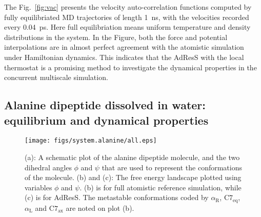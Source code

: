\documentclass[epjST]{svjour}
\newcommand{\recheck}[1]{{\color{red} #1}}
\newcommand{\confa}[0]{{\alpha_{\textrm{R}}}}
\newcommand{\confb}[0]{{\textrm{C}7_{\textrm{eq}}}}
\newcommand{\confc}[0]{{\alpha_{\textrm{L}}}}
\newcommand{\confd}[0]{{\textrm{C}7_{\textrm{ax}}}}
\begin{document}
The Fig.~\ref{fig:vac} presents the velocity auto-correlation
functions computed by fully equilibriated MD trajectories of length 1~ns, with the
velocities recorded every 0.04~ps.  Here full equilibriation means
uniform temperature and density distributions in the system.
In the Figure, both the force and potential interpolations are
in almost perfect agreement with the  atomistic simulation under Hamiltonian dynamics.
This indicates that the AdResS with the local thermostat
is a promising method to investigate the dynamical properties
in the concurrent multiscale simulation.




\subsection{Alanine dipeptide dissolved in water: equilibrium and dynamical properties}

\begin{figure}
  \centering
  \texttt{[image: figs/system.alanine/all.eps]}
  \caption{(a): A schematic plot of the alanine dipeptide molecule,
    and the two dihedral angles $\phi$ and $\psi$ that are used to
    represent the conformations of the molecule. (b) and (c): The free
    energy landscape plotted using variables $\phi$ and $\psi$.  (b)
    is for full atomistic reference simulation, while (c) is for
    AdResS. The metastable conformations coded by $\confa$, $\confb$, $\confc$ and $\confd$
    are noted on plot (b).}
  \label{fig:ala}
\end{figure}
\end{document}
